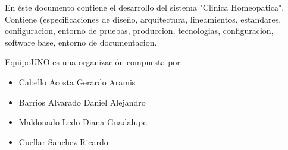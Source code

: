 


En \'este documento contiene el desarrollo del sistema "Clinica Homeopatica".\\
Contiene (especificaciones de diseño, arquitectura, lineamientos, estandares, configuracion, entorno de pruebas, produccion, tecnologias, configuracion, software base, entorno de documentacion.

EquipoUNO es una organizaci\'on compuesta por:
\begin{itemize}
\item Cabello Acosta Gerardo Aramis
\item Barrios Alvarado Daniel Alejandro
\item Maldonado Ledo Diana Guadalupe
\item Cuellar Sanchez Ricardo
\end{itemize}


